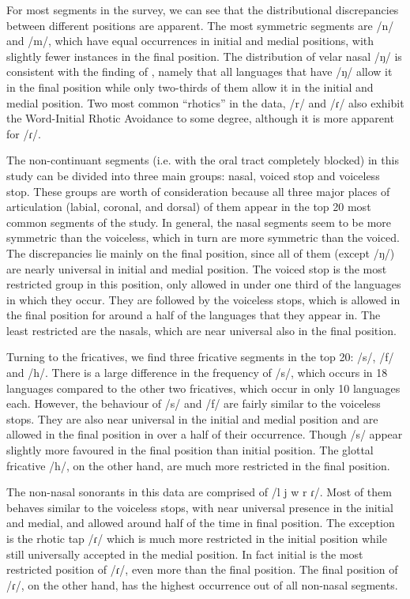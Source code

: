 \par
For most segments in the survey, we can see that the distributional discrepancies between different positions are apparent. 
The most symmetric segments are /n/ and /m/, which have equal occurrences in initial and medial positions, with slightly fewer instances in the final position. 
The distribution of velar nasal /ŋ/ is consistent with the finding of \citet{wals-9}, namely that all languages that have /ŋ/ allow it in the final position while only two-thirds of them allow it in the initial and medial position. 
Two most common ``rhotics'' in the data, /r/ and /ɾ/ also exhibit the Word-Initial Rhotic Avoidance to some degree, although it is more apparent for /ɾ/.

\par
The non-continuant segments (i.e. with the oral tract completely blocked) in this study can be divided into three main groups: nasal, voiced stop and voiceless stop. 
These groups are worth of consideration because all three major places of articulation (labial, coronal, and dorsal) of them appear in the top 20 most common segments of the study. 
In general, the nasal segments seem to be more symmetric than the voiceless, which in turn are more symmetric than the voiced.
The discrepancies lie mainly on the final position, since all of them (except /ŋ/) are nearly universal in initial and medial position.
The voiced stop is the most restricted group in this position, only allowed in under one third of the languages in which they occur. They are followed by the voiceless stops, which is allowed in the final position for around a half of the languages that they appear in. The least restricted are the nasals, which are near universal also in the final position.


\par
Turning to the fricatives, we find three fricative segments in the top 20: /s/, /f/ and /h/. 
There is a large difference in the frequency of /s/, which occurs in 18 languages compared to the other two fricatives, which occur in only 10 languages each. 
However, the behaviour of /s/ and /f/ are fairly similar to the voiceless stops. 
They are also near universal in the initial and medial position and are allowed in the final position in over a half of their occurrence. 
Though /s/ appear slightly more favoured in the final position than initial position. The glottal fricative /h/, on the other hand, are much more restricted in the final position. 

\par
The non-nasal sonorants in this data are comprised of /l j w r ɾ/. 
Most of them behaves similar to the voiceless stops, with near universal presence in the initial and medial, and allowed around half of the time in final position. 
The exception is the rhotic tap /ɾ/ which is much more restricted in the initial position while still universally accepted in the medial position. 
In fact initial is the most restricted position of /ɾ/, even more than the final position. 
The final position of /ɾ/, on the other hand, has the highest occurrence out of all non-nasal segments.

